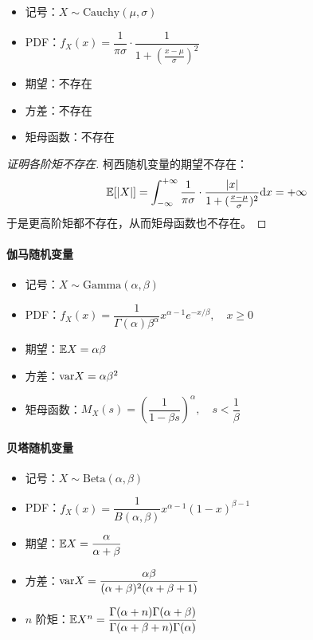 \begin{itemize}[itemsep=1ex]
    \item 记号：$X\sim\text{Cauchy}(\mu,\sigma)$
    \item PDF：$f_X(x)=\dfrac{1}{\pi\sigma}\cdot\dfrac{1}{1+(\frac{x-\mu}{\sigma})^2}$
    \item 期望：不存在
    \item 方差：不存在
    \item 矩母函数：不存在
\end{itemize}
\begin{proof}[证明各阶矩不存在]
柯西随机变量的期望不存在：
\[
\mathbb{E}[|X|]=\int_{-\infty}^{+\infty}\frac{1}{\pi\sigma}\cdot\frac{|x|}{1+(\frac{x-\mu}{\sigma})^2}\mathrm dx=+\infty
\]
于是更高阶矩都不存在，从而矩母函数也不存在。
\end{proof}

\paragraph{伽马随机变量}

\begin{itemize}[itemsep=1ex]
    \item 记号：$X\sim\text{Gamma}(\alpha,\beta)$
    \item PDF：$f_X(x)=\dfrac{1}{\Gamma(\alpha)\beta^\alpha} x^{\alpha-1}e^{-x/\beta},\quad x\geqslant 0$
    \item 期望：$\mathbb{E} X=\alpha\beta$
    \item 方差：$\mathrm{var} X=\alpha\beta^2$
    \item 矩母函数：$M_X(s)=\left(\dfrac{1}{1-\beta s}\right)^\alpha,\quad s<\dfrac{1}{\beta}$
\end{itemize}


\paragraph{贝塔随机变量}

\begin{itemize}[itemsep=1ex]
    \item 记号：$X\sim\text{Beta}(\alpha,\beta)$
    \item PDF：$f_X(x)=\dfrac{1}{B(\alpha,\beta)}x^{\alpha-1}(1-x)^{\beta-1}$
    \item 期望：$\mathbb{E} X=\dfrac{\alpha}{\alpha+\beta}$
    \item 方差：$\mathrm{var} X=\dfrac{\alpha\beta}{(\alpha+\beta)^2(\alpha+\beta+1)}$
    \item $n$ 阶矩：$\mathbb{E} X^n=\dfrac{\Gamma(\alpha+n)\Gamma(\alpha+\beta)}{\Gamma(\alpha+\beta+n)\Gamma(\alpha)}$
\end{itemize}

